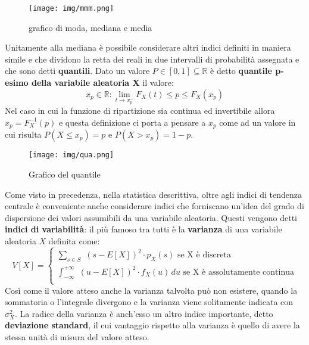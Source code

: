 \documentclass[a4paper,12pt, oneside]{book}
\newcommand{\numberset}{\mathbb}
\newcommand{\R}{\numberset{R}}
\begin{document}
\begin{figure}
    \centering
    \caption{grafico di moda, mediana e media}
    \label{fig:centralValue}
    \texttt{[image: img/mmm.png]}
\end{figure}
Unitamente alla mediana è possibile considerare altri indici definiti in maniera simile e che dividono
la retta dei reali in due intervalli di probabilità assegnata e che sono detti \textbf{quantili}.\newline
Dato un valore $P \in [0,1] \subseteq \R$ è detto \textbf{quantile p-esimo della variabile aleatoria X} il valore:
\[x_p \in \R:\lim_{t \to x_p^{-}} F_X(t) \leq p \leq F_X(x_p)\]
Nel caso in cui la funzione di ripartizione sia continua ed invertibile allora $x_p = F_X^{-1}(p)$
e questa definizione ci porta a pensare a $x_p$ come ad un valore in cui risulta $P(X \leq x_p) = p$ e $P(X > x_p) = 1-p$.

\begin{figure}
    \centering
    \caption{Grafico del quantile}
    \texttt{[image: img/qua.png]}
\end{figure}

Come visto in precedenza, nella statistica descrittiva, oltre agli indici di tendenza centrale è conveniente 
anche considerare indici che forniscano un'idea del grado di dispersione dei valori 
assumibili da una variabile aleatoria.\newline
Questi vengono detti \textbf{indici di variabilità}: il più famoso tra tutti è la \textbf{varianza}
di una variabile aleatoria $X$ definita come:
\[V[X] = \begin{cases}
        \sum_{s \in S}\,\, (s - E[X])^2 \cdot p_X(s)\mbox{ se X è discreta}\\
        \int_{-\infty}^{+\infty}\,\, (u - E[X])^2 \cdot f_X(u)\,du\mbox{ se X è assolutamente continua}\\
\end{cases}\]
Così come il valore atteso anche la varianza talvolta può non esistere, quando la sommatoria o l'integrale divergono
e la varianza viene solitamente indicata con $\sigma_X ^2$.\newline
La radice della varianza è anch'esso un altro indice importante, detto \textbf{deviazione standard}, il cui
vantaggio rispetto alla varianza è quello di avere la stessa unità di misura del valore atteso.
\end{document}
